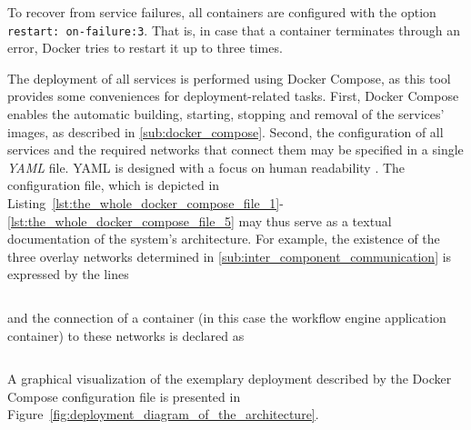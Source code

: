   To recover from service failures, all containers are configured with the option \texttt{restart: on-failure:3}. That is, in case that a container terminates through an error, Docker tries to restart it up to three times.

  The deployment of all services is performed using Docker Compose, as this tool provides some conveniences for deployment-related tasks.
  First, Docker Compose enables the automatic building, starting, stopping and removal of the services' images, as described in \ref{sub:docker_compose}.
  Second, the configuration of all services and the required networks that connect them may be specified in a single \emph{YAML} file. \ac{YAML} is designed with a focus on human readability \cite{Kiki2009Yaml}.
  The configuration file, which is depicted in Listing~\ref{lst:the_whole_docker_compose_file_1}-\ref{lst:the_whole_docker_compose_file_5} may thus serve as a textual documentation of the system's architecture.
  For example, the existence of the three overlay networks determined in \ref{sub:inter_component_communication} is expressed by the lines

  \inputminted[firstline=3,lastline=9,fontsize=\footnotesize,linenos=true,numberblanklines=true,showspaces=false,breaklines=true,baselinestretch=1]{yaml}{../code/wfms.yml}

  and the connection of a container (in this case the workflow engine application container) to these networks is declared as

  \inputminted[firstline=43,lastline=45,fontsize=\footnotesize,linenos=true,numberblanklines=true,showspaces=false,breaklines=true,baselinestretch=1]{yaml}{../code/wfms.yml}

  A graphical visualization of the exemplary deployment described by the Docker Compose configuration file is presented in Figure~\ref{fig:deployment_diagram_of_the_architecture}.

